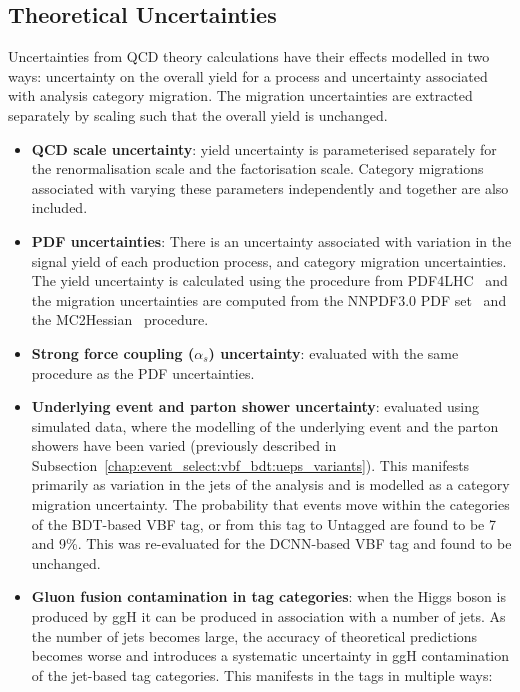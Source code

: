 \subsection{Theoretical Uncertainties}
Uncertainties from QCD theory calculations have their effects modelled in two ways: uncertainty on the overall yield for a process and uncertainty associated with analysis category migration. 
The migration uncertainties are extracted separately by scaling such that the overall yield is unchanged.  
\begin{itemize}[noitemsep]
    \item {\textbf{QCD scale uncertainty}: yield uncertainty is parameterised separately for the renormalisation scale and the factorisation scale. 
                                            Category migrations associated with varying these parameters independently and together are also included.}
    \item{\textbf{PDF uncertainties}: There is an uncertainty associated with variation in the signal yield of each production process, and category migration uncertainties.   
        The yield uncertainty is calculated using the procedure from PDF4LHC~\cite{PDF4LHC} and the migration uncertainties are computed from the NNPDF3.0 PDF set~\cite{NNPDF3} and the MC2Hessian~\cite{MC2Hessian} procedure.}
    \item{\textbf{Strong force coupling ($\alpha_{s}$) uncertainty}: evaluated with the same procedure as the PDF uncertainties.}
    \item{\textbf{Underlying event and parton shower uncertainty}: evaluated using simulated data, where the modelling of the underlying event and the parton showers have been varied (previously described in Subsection~\ref{chap:event_select:vbf_bdt:ueps_variants}). This manifests primarily as variation in the jets of the analysis and is modelled as a category migration uncertainty. The probability that events move within the categories of the BDT-based VBF tag, or from this tag to Untagged are found to be 7 and 9\%. This was re-evaluated for the DCNN-based VBF tag and found to be unchanged.}
    \item{\textbf{Gluon fusion contamination in \ttH tag categories}: when the Higgs boson is produced by ggH it can be produced in association with a number of jets. As the number of jets becomes large, the accuracy of theoretical predictions becomes worse and introduces a systematic uncertainty in ggH contamination of the jet-based tag categories. This manifests in the \ttH tags in multiple ways:
}
\end{itemize}
